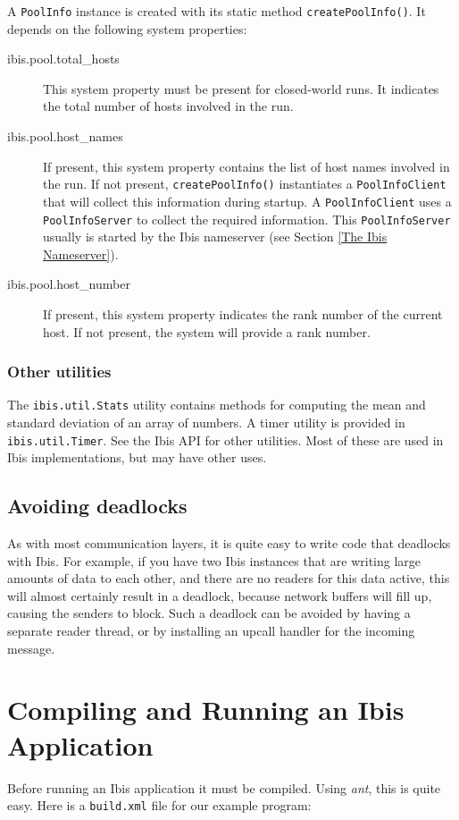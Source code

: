 \documentclass[10pt]{article}
\newcommand{\mysection}[1]{\section{#1}\label{#1}}
\newcommand{\mysubsection}[1]{\subsection{#1}\label{#1}}
\newcommand{\mysubsubsection}[1]{\subsubsection{#1}\label{#1}}
\begin{document}
\noindent
A \texttt{PoolInfo} instance is created with its 
static method \texttt{createPoolInfo()}.
It depends on the following system properties:
\begin{description}
\item[ibis.pool.total\_hosts]
This system property must be present for closed-world runs.
It indicates the total number of hosts involved in the run.
\item[ibis.pool.host\_names]
If present, this system property contains the list of host names
involved in the run.
If not present, \texttt{createPoolInfo()} instantiates
a \texttt{PoolInfoClient}
that will collect this information during startup.
A \texttt{PoolInfoClient} uses a \texttt{PoolInfoServer} to collect the
required information.
This \texttt{PoolInfoServer} usually is started by the Ibis nameserver
(see Section \ref{The Ibis Nameserver}).

\item[ibis.pool.host\_number]
If present, this system property indicates the rank number of the
current host. If not present, the system will provide a rank number.
\end{description}

\mysubsubsection{Other utilities}

The \texttt{ibis.util.Stats} utility contains methods for computing
the mean and standard deviation of an array of numbers.
A timer utility is provided in \texttt{ibis.util.Timer}.
See the Ibis API for other utilities. Most of these are used in
Ibis implementations, but may have other uses.

\mysubsection{Avoiding deadlocks}

As with most communication layers, it is quite easy to write code that
deadlocks with Ibis. For example, if you have two Ibis instances that
are writing large amounts of data to each other, and there are no
readers for this data active, this will almost certainly result in a deadlock,
because network buffers will fill up, causing the senders to block.
Such a deadlock can be avoided by having a separate reader thread,
or by installing an upcall handler for the incoming message.

\mysection{Compiling and Running an Ibis Application}

Before running an Ibis application it must be compiled.  Using
\emph{ant}, this is quite easy. Here is a \texttt{build.xml} file
for our example program:
\end{document}
